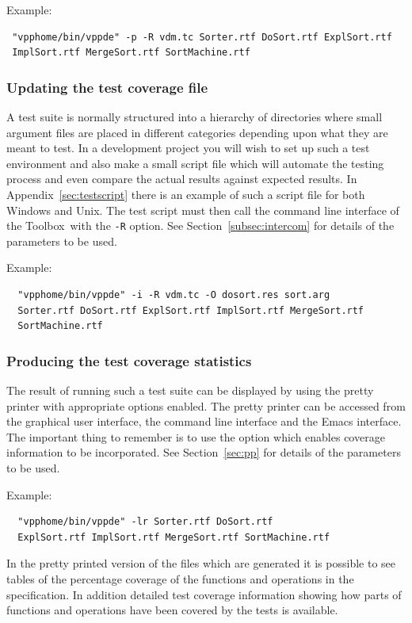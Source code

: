 \documentclass[\pformat,12pt]{article}
\newcommand{\Toolbox}{Toolbox}
\begin{document}
Example:
\begin{verbatim}
 "vpphome/bin/vppde" -p -R vdm.tc Sorter.rtf DoSort.rtf ExplSort.rtf
 ImplSort.rtf MergeSort.rtf SortMachine.rtf
\end{verbatim}

\subsubsection{Updating the test coverage file}

A test suite is normally structured into a hierarchy of directories
where small argument files are placed in different categories
depending upon what they are meant to test.  In a development project
you will wish to set up such a test environment and also make
a small script file which will automate the testing process and even
compare the actual results against expected results. In
Appendix~\ref{sec:testscript} 
there is an example of such a script file for both Windows and Unix.
The test script must then call the command line interface of the
\Toolbox\ with the {\tt -R} option. See Section~\ref{subsec:intercom}
for details of the parameters to be used.

Example:
\begin{verbatim}
  "vpphome/bin/vppde" -i -R vdm.tc -O dosort.res sort.arg 
  Sorter.rtf DoSort.rtf ExplSort.rtf ImplSort.rtf MergeSort.rtf 
  SortMachine.rtf 
\end{verbatim}

\subsubsection{Producing the test coverage statistics}

The result of running such a test suite can be displayed by using the
pretty printer with appropriate options enabled.  The pretty printer
can be accessed from the graphical user interface, the command
line interface and the Emacs interface. The important thing to
remember is to use the option which enables coverage information to be
incorporated. See Section~\ref{sec:pp} for details of the
parameters to be used.

Example:
\begin{verbatim}
  "vpphome/bin/vppde" -lr Sorter.rtf DoSort.rtf
  ExplSort.rtf ImplSort.rtf MergeSort.rtf SortMachine.rtf
\end{verbatim}

In the pretty printed version of the files which are generated it is
possible to see tables of the percentage coverage of the functions
and operations in the specification. In addition detailed test
coverage information showing how parts of functions and operations
have been covered by the tests is available.
\end{document}
